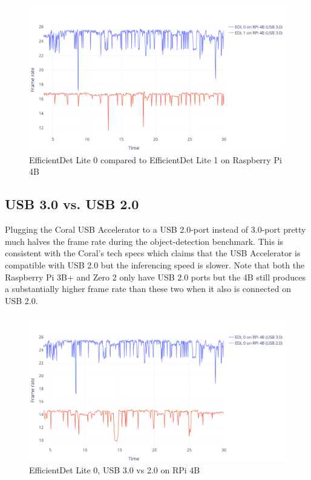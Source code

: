 \begin{figure}[H]
    \centering
    \includegraphics[width=\textwidth]{fig/plots/EDL0_vs_EDL1.png}
    \caption{EfficientDet Lite 0 compared to EfficientDet Lite 1 on Raspberry Pi 4B}
    \label{fig:edl0_vs_edl1}
\end{figure}

\newpage

\subsection{USB 3.0 vs. USB 2.0}

Plugging the Coral USB Accelerator to a USB 2.0-port instead of 3.0-port pretty much halves the frame rate during the object-detection benchmark. This is consistent with the Coral's tech specs\cite{CoralTPU} which claims that the USB Accelerator is compatible with USB 2.0 but the inferencing speed is slower. Note that both the Raspberry Pi 3B+ and Zero 2 only have USB 2.0 ports but the 4B still produces a substantially higher frame rate than these two when it also is connected on USB 2.0.

\begin{figure}[H]
    \centering
    \includegraphics[width=\textwidth]{fig/plots/EDL0-USB_3_vs_2.png}
    \caption{EfficientDet Lite 0, USB 3.0 vs 2.0 on RPi 4B}
    \label{fig:edl0-usb_2_vs_3}
\end{figure}

